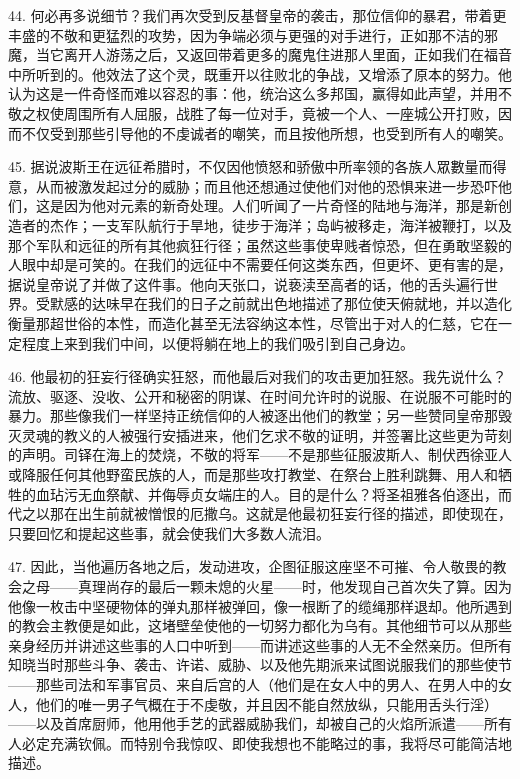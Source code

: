 44. 何必再多说细节？我们再次受到反基督皇帝的袭击，那位信仰的暴君，带着更丰盛的不敬和更猛烈的攻势，因为争端必须与更强的对手进行，正如那不洁的邪魔，当它离开人游荡之后，又返回带着更多的魔鬼住进那人里面，正如我们在福音中所听到的。他效法了这个灵，既重开以往败北的争战，又增添了原本的努力。他认为这是一件奇怪而难以容忍的事：他，统治这么多邦国，赢得如此声望，并用不敬之权使周围所有人屈服，战胜了每一位对手，竟被一个人、一座城公开打败，因而不仅受到那些引导他的不虔诚者的嘲笑，而且按他所想，也受到所有人的嘲笑。\par

45. 据说波斯王在远征希腊时，不仅因他愤怒和骄傲中所率领的各族人眾數量而得意，从而被激发起过分的威胁；而且他还想通过使他们对他的恐惧来进一步恐吓他们，这是因为他对元素的新奇处理。人们听闻了一片奇怪的陆地与海洋，那是新创造者的杰作；一支军队航行于旱地，徒步于海洋；岛屿被移走，海洋被鞭打，以及那个军队和远征的所有其他疯狂行径；虽然这些事使卑贱者惊恐，但在勇敢坚毅的人眼中却是可笑的。在我们的远征中不需要任何这类东西，但更坏、更有害的是，据说皇帝说了并做了这件事。他向天张口，说亵渎至高者的话，他的舌头遍行世界。受默感的达味早在我们的日子之前就出色地描述了那位使天俯就地，并以造化衡量那超世俗的本性，而造化甚至无法容纳这本性，尽管出于对人的仁慈，它在一定程度上来到我们中间，以便将躺在地上的我们吸引到自己身边。\par

46. 他最初的狂妄行径确实狂怒，而他最后对我们的攻击更加狂怒。我先说什么？流放、驱逐、没收、公开和秘密的阴谋、在时间允许时的说服、在说服不可能时的暴力。那些像我们一样坚持正统信仰的人被逐出他们的教堂；另一些赞同皇帝那毁灭灵魂的教义的人被强行安插进来，他们乞求不敬的证明，并签署比这些更为苛刻的声明。司铎在海上的焚烧，不敬的将军——不是那些征服波斯人、制伏西徐亚人或降服任何其他野蛮民族的人，而是那些攻打教堂、在祭台上胜利跳舞、用人和牺牲的血玷污无血祭献、并侮辱贞女端庄的人。目的是什么？将圣祖雅各伯逐出，而代之以那在出生前就被憎恨的厄撒乌。这就是他最初狂妄行径的描述，即使现在，只要回忆和提起这些事，就会使我们大多数人流泪。\par

47. 因此，当他遍历各地之后，发动进攻，企图征服这座坚不可摧、令人敬畏的教会之母——真理尚存的最后一颗未熄的火星——时，他发现自己首次失了算。因为他像一枚击中坚硬物体的弹丸那样被弹回，像一根断了的缆绳那样退却。他所遇到的教会主教便是如此，这堵壁垒使他的一切努力都化为乌有。其他细节可以从那些亲身经历并讲述这些事的人口中听到——而讲述这些事的人无不全然亲历。但所有知晓当时那些斗争、袭击、许诺、威胁、以及他先期派来试图说服我们的那些使节——那些司法和军事官员、来自后宫的人（他们是在女人中的男人、在男人中的女人，他们的唯一男子气概在于不虔敬，并且因不能自然放纵，只能用舌头行淫）——以及首席厨师，他用他手艺的武器威胁我们，却被自己的火焰所派遣——所有人必定充满钦佩。而特别令我惊叹、即使我想也不能略过的事，我将尽可能简洁地描述。\par

